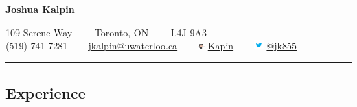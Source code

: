 \documentclass[10pt,letterpaper]{article}
\begin{document}
\begin{center}
{\LARGE \textbf{Joshua Kalpin}}

109 Serene Way\ \ \textbullet
\ \ Toronto, ON\ \ \textbullet
\ \ L4J 9A3
\\
\Mobilefone (519) 741-7281 \ \textbullet
\ \ \Letter \href{mailto:jkalpin@uwaterloo.ca}{jkalpin@uwaterloo.ca} \ \textbullet
\ \ \includegraphics[height=6pt]{Octocat} 
\href{https://github.com/kapin}{Kapin} \ \textbullet
\ \ \includegraphics[height=10pt]{twitter} 
\href{https://twitter.com/jk855}{@jk855}
\end{center}

\hrule
\vspace{-0.4em}
\subsection*{Experience}
\end{document}
